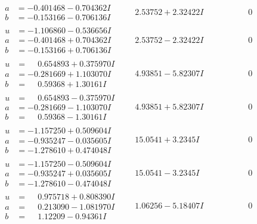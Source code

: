 \documentclass[1p]{elsarticle_modified}
\theoremstyle{definition}
\begin{document}
$$\begin{array}{c|c|c}
\begin{aligned}
a &= -0.401468 - 0.704362 I \\
b &= -0.153166 - 0.706136 I\end{aligned}
 & \phantom{-}2.53752 + 2.32422 I & \phantom{-0.000000 } 0 \\ \hline\begin{aligned}
u &= -1.106860 - 0.536656 I \\
a &= -0.401468 + 0.704362 I \\
b &= -0.153166 + 0.706136 I\end{aligned}
 & \phantom{-}2.53752 - 2.32422 I & \phantom{-0.000000 } 0 \\ \hline\begin{aligned}
u &= \phantom{-}0.654893 + 0.375970 I \\
a &= -0.281669 + 1.103070 I \\
b &= \phantom{-}0.59368 + 1.30161 I\end{aligned}
 & \phantom{-}4.93851 - 5.82307 I & \phantom{-0.000000 } 0 \\ \hline\begin{aligned}
u &= \phantom{-}0.654893 - 0.375970 I \\
a &= -0.281669 - 1.103070 I \\
b &= \phantom{-}0.59368 - 1.30161 I\end{aligned}
 & \phantom{-}4.93851 + 5.82307 I & \phantom{-0.000000 } 0 \\ \hline\begin{aligned}
u &= -1.157250 + 0.509604 I \\
a &= -0.935247 - 0.035605 I \\
b &= -1.278610 + 0.474048 I\end{aligned}
 & \phantom{-}15.0541 + 3.2345 I & \phantom{-0.000000 } 0 \\ \hline\begin{aligned}
u &= -1.157250 - 0.509604 I \\
a &= -0.935247 + 0.035605 I \\
b &= -1.278610 - 0.474048 I\end{aligned}
 & \phantom{-}15.0541 - 3.2345 I & \phantom{-0.000000 } 0 \\ \hline\begin{aligned}
u &= \phantom{-}0.975718 + 0.808390 I \\
a &= \phantom{-}0.213090 - 1.081970 I \\
b &= \phantom{-}1.12209 - 0.94361 I\end{aligned}
 & \phantom{-}1.06256 - 5.18407 I & \phantom{-0.000000 } 0 \\ \hline\begin{aligned}

\end{aligned}
\end{array}$$
\end{document}
